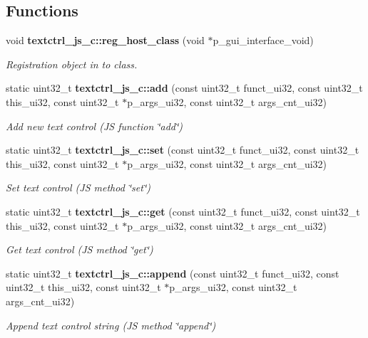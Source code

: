 \subsection*{Functions}
\begin{DoxyCompactItemize}
\item 
void \textbf{ textctrl\+\_\+js\+\_\+c\+::reg\+\_\+host\+\_\+class} (void $\ast$p\+\_\+gui\+\_\+interface\+\_\+void)
\begin{DoxyCompactList}\small\item\em Registration object in to class. \end{DoxyCompactList}\item 
static uint32\+\_\+t \textbf{ textctrl\+\_\+js\+\_\+c\+::add} (const uint32\+\_\+t funct\+\_\+ui32, const uint32\+\_\+t this\+\_\+ui32, const uint32\+\_\+t $\ast$p\+\_\+args\+\_\+ui32, const uint32\+\_\+t args\+\_\+cnt\+\_\+ui32)
\begin{DoxyCompactList}\small\item\em Add new text control (JS function \char`\"{}add\char`\"{}) \end{DoxyCompactList}\item 
static uint32\+\_\+t \textbf{ textctrl\+\_\+js\+\_\+c\+::set} (const uint32\+\_\+t funct\+\_\+ui32, const uint32\+\_\+t this\+\_\+ui32, const uint32\+\_\+t $\ast$p\+\_\+args\+\_\+ui32, const uint32\+\_\+t args\+\_\+cnt\+\_\+ui32)
\begin{DoxyCompactList}\small\item\em Set text control (JS method \char`\"{}set\char`\"{}) \end{DoxyCompactList}\item 
static uint32\+\_\+t \textbf{ textctrl\+\_\+js\+\_\+c\+::get} (const uint32\+\_\+t funct\+\_\+ui32, const uint32\+\_\+t this\+\_\+ui32, const uint32\+\_\+t $\ast$p\+\_\+args\+\_\+ui32, const uint32\+\_\+t args\+\_\+cnt\+\_\+ui32)
\begin{DoxyCompactList}\small\item\em Get text control (JS method \char`\"{}get\char`\"{}) \end{DoxyCompactList}\item 
static uint32\+\_\+t \textbf{ textctrl\+\_\+js\+\_\+c\+::append} (const uint32\+\_\+t funct\+\_\+ui32, const uint32\+\_\+t this\+\_\+ui32, const uint32\+\_\+t $\ast$p\+\_\+args\+\_\+ui32, const uint32\+\_\+t args\+\_\+cnt\+\_\+ui32)
\begin{DoxyCompactList}\small\item\em Append text control string (JS method \char`\"{}append\char`\"{}) \end{DoxyCompactList}\end{DoxyCompactItemize}


